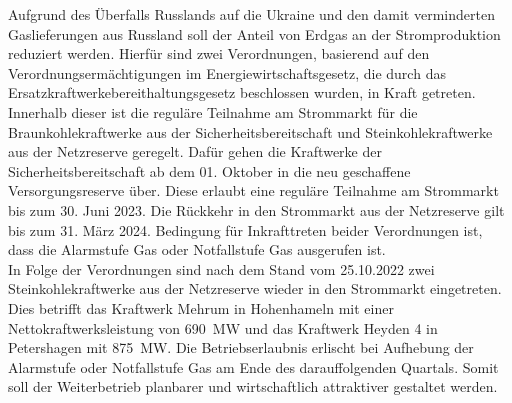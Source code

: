 		Aufgrund des Überfalls Russlands auf die Ukraine und den damit verminderten Gaslieferungen aus Russland soll der Anteil von Erdgas an der Stromproduktion reduziert werden.
		Hierfür sind zwei Verordnungen, basierend auf den Verordnungsermächtigungen im Energiewirtschaftsgesetz, die durch das Ersatzkraftwerkebereithaltungsgesetz beschlossen wurden, in Kraft getreten.
		Innerhalb dieser ist die reguläre Teilnahme am Strommarkt für die Braunkohlekraftwerke aus der Sicherheitsbereitschaft und Steinkohlekraftwerke aus der Netzreserve geregelt.
		Dafür gehen die Kraftwerke der Sicherheitsbereitschaft ab dem 01. Oktober in die neu geschaffene Versorgungsreserve über.
		Diese erlaubt eine reguläre Teilnahme am Strommarkt bis zum 30. Juni 2023.
		Die Rückkehr in den Strommarkt aus der Netzreserve gilt bis zum 31. März 2024.
		Bedingung für Inkrafttreten beider Verordnungen ist, dass die Alarmstufe Gas oder Notfallstufe Gas ausgerufen ist. \\
		
		In Folge der Verordnungen sind nach dem Stand vom 25.10.2022 zwei Steinkohlekraftwerke aus der Netzreserve wieder in den Strommarkt eingetreten.
		Dies betrifft das Kraftwerk Mehrum in Hohenhameln mit einer Nettokraftwerksleistung von \SI{690}{\mega\watt} und das Kraftwerk Heyden 4 in Petershagen mit \SI{875}{\mega\watt}.
		Die Betriebserlaubnis erlischt bei Aufhebung der Alarmstufe oder Notfallstufe Gas am Ende des darauffolgenden Quartals.
		Somit soll der Weiterbetrieb planbarer und wirtschaftlich attraktiver gestaltet werden.
		
		
		
\clearpage
	